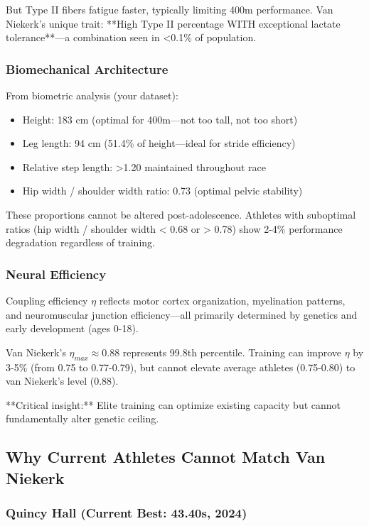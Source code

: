 But Type II fibers fatigue faster, typically limiting 400m performance. Van Niekerk's unique trait: **High Type II percentage WITH exceptional lactate tolerance**—a combination seen in <0.1\% of population.

\subsubsection{Biomechanical Architecture}

From biometric analysis (your dataset):
\begin{itemize}
    \item Height: 183 cm (optimal for 400m—not too tall, not too short)
    \item Leg length: 94 cm (51.4\% of height—ideal for stride efficiency)
    \item Relative step length: >1.20 maintained throughout race
    \item Hip width / shoulder width ratio: 0.73 (optimal pelvic stability)
\end{itemize}

These proportions cannot be altered post-adolescence. Athletes with suboptimal ratios (hip width / shoulder width < 0.68 or > 0.78) show 2-4\% performance degradation regardless of training.

\subsubsection{Neural Efficiency}

Coupling efficiency $\eta$ reflects motor cortex organization, myelination patterns, and neuromuscular junction efficiency—all primarily determined by genetics and early development (ages 0-18).

Van Niekerk's $\eta_{max} \approx 0.88$ represents 99.8th percentile. Training can improve $\eta$ by 3-5\% (from 0.75 to 0.77-0.79), but cannot elevate average athletes (0.75-0.80) to van Niekerk's level (0.88).

**Critical insight:** Elite training can optimize existing capacity but cannot fundamentally alter genetic ceiling.

\subsection{Why Current Athletes Cannot Match Van Niekerk}

\subsubsection{Quincy Hall (Current Best: 43.40s, 2024)}

